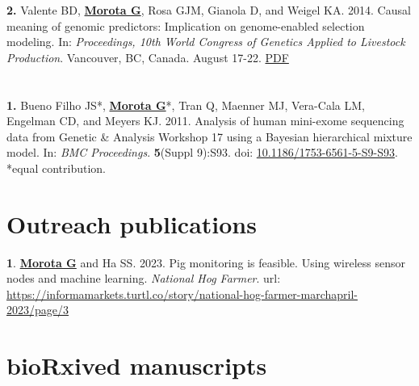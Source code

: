 \documentclass[margin,line,10pt]{res}
\newenvironment{list1}{
  \begin{list}{\ding{113}}{%
      \setlength{\itemsep}{0in}
      \setlength{\parsep}{0in} \setlength{\parskip}{0in}
      \setlength{\topsep}{0in} \setlength{\partopsep}{0in} 
      \setlength{\leftmargin}{0.17in}}}{\end{list}}
\begin{document}
\begin{resume}
\begin{list1}
\item [\bf{2}.] Valente BD, {\bf \underline{Morota G}}, Rosa GJM, Gianola D, and  Weigel KA. 2014. 
Causal meaning of genomic predictors: Implication on genome-enabled selection modeling. In: \emph{Proceedings, 10th World Congress of Genetics Applied to Livestock Production}. Vancouver, BC, Canada. August 17-22. 
\textcolor{blue}{\href{http://www.morotalab.org/publications/pdf/valente2014WCGALP.pdf}{PDF}}
\end{list1}


\section{}
\begin{list1}
\item [\bf{1}.] Bueno Filho JS*, {\bf \underline{Morota G}}*, Tran Q, Maenner MJ, Vera-Cala LM, Engelman CD, and Meyers KJ. 2011. Analysis of human mini-exome sequencing data from Genetic \& Analysis Workshop 17 using a  Bayesian hierarchical mixture model. In: \emph{BMC Proceedings}. {\bf 5}(Suppl 9):S93. doi: \textcolor{blue}{\href{http://dx.doi.org/10.1186/1753-6561-5-S9-S93}{10.1186/1753-6561-5-S9-S93}}. *equal contribution.   
\end{list1}



\vspace{1.0cm}
\section{\sc Outreach publications}

\begin{list1}

  \item [{\bf 1}.] \textbf{\underline{Morota G}} and Ha SS. 2023. Pig monitoring is feasible. Using wireless sensor nodes and machine learning. \emph{National Hog Farmer}. url: \textcolor{blue}{\href{https://informamarkets.turtl.co/story/national-hog-farmer-marchapril-2023/page/3}{https://informamarkets.turtl.co/story/national-hog-farmer-marchapril-2023/page/3}}

\end{list1}




\vspace{1.0cm}
\section{\sc bioRxived manuscripts}


\end{resume}
\end{document}
